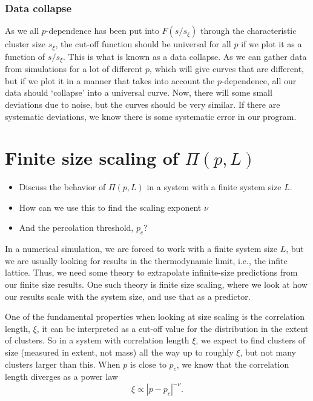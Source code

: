 \documentclass[a4paper, 11pt, notitlepage, english]{article}
\begin{document}
\subsubsection*{Data collapse}
As we all $p$-dependence has been put into $F(s/s_\xi)$ through the characteristic cluster size $s_\xi$, the cut-off function should be universal for all $p$ if we plot it as a function of $s/s_\xi$. This is what is known as a data collapse. As we can gather data from simulations for a lot of different $p$, which will give curves that are different, but if we plot it in a manner that takes into account the $p$-dependence, all our data should `collapse' into a universal curve. Now, there will some small deviations due to noise, but the curves should be very similar. If there are systematic deviations, we know there is some systematic error in our program.


\clearpage


\section{Finite size scaling of $\Pi(p, L)$}
\begin{itemize}
	\item Discuss the behavior of $\Pi(p, L)$ in a system with a finite system size $L$.
	\item How can we use this to find the scaling exponent $\nu$
	\item And the percolation threshold, $p_c$?
\end{itemize}

In a numerical simulation, we are forced to work with a finite system size $L$, but we are usually looking for results in the thermodynamic limit, i.e., the infite lattice. Thus, we need some theory to extrapolate infinite-size predictions from our finite size results. One such theory is finite size scaling, where we look at how our results scale with the system size, and use that as a predictor.

One of the fundamental properties when looking at size scaling is the correlation length, $\xi$, it can be interpreted as a cut-off value for the distribution in the extent of clusters. So in a system with correlation length $\xi$, we expect to find clusters of size (measured in extent, not mass) all the way up to roughly $\xi$, but not many clusters larger than this. When $p$ is close to $p_c$, we know that the correlation length diverges as a power law
$$\xi \propto |p-p_c|^{-\nu}.$$
\end{document}

